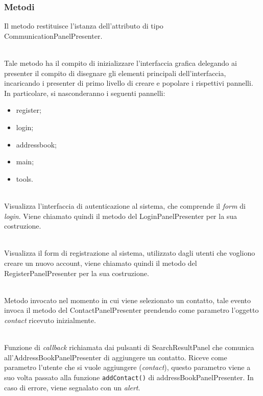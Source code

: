 \subsubsection*{Metodi}
\begin{description}
\item{}
Il metodo restituisce l'istanza dell'attributo di tipo  CommunicationPanelPresenter.

\item{}\\
Tale metodo ha il compito di inizializzare l'interfaccia grafica delegando ai presenter il compito di disegnare gli elementi principali dell'interfaccia, incaricando i presenter di primo livello di creare e popolare i rispettivi pannelli. In particolare, si nasconderanno i seguenti pannelli:
\begin{itemize}
\item register;
\item login;
\item addressbook;
\item main;
\item tools.
\end{itemize}


\item{}\\
Visualizza l'interfaccia di autenticazione al sistema, che comprende il \textit{form} di \textit{login}. Viene chiamato quindi il metodo  del LoginPanelPresenter per la sua costruzione.
	
\item{}\\
Visualizza il form di registrazione al sistema, utilizzato dagli utenti che vogliono creare un nuovo account, viene chiamato quindi il metodo  del RegisterPanelPresenter per la sua costruzione.

\item{}\\
Metodo invocato nel momento in cui viene selezionato un contatto, tale evento invoca il metodo  del ContactPanelPresenter prendendo come parametro l'oggetto \textit{contact} ricevuto inizialmente. 


\item{}\\
Funzione di \textit{callback} richiamata dai pulsanti di SearchResultPanel che comunica all'AddressBookPanelPresenter di aggiungere un contatto. Riceve come parametro l'utente che si vuole aggiungere (\textit{contact}), questo parametro viene a suo volta passato alla funzione \texttt{addContact()} di addressBookPanelPresenter. In caso di errore, viene segnalato con un \textit{alert}.


\end{description}
